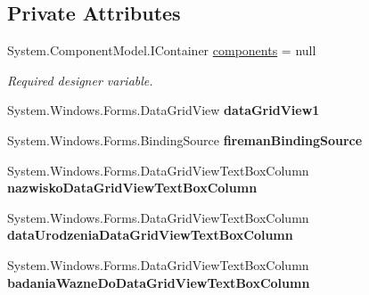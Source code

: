 \subsection*{Private Attributes}
\begin{DoxyCompactItemize}
\item 
System.\+Component\+Model.\+I\+Container \mbox{\hyperlink{class_statystyki___o_s_p_1_1_fireman_list_form_aa543afa3e418462460450e4efa38e36b}{components}} = null
\begin{DoxyCompactList}\small\item\em Required designer variable. \end{DoxyCompactList}\item 
\mbox{\label{class_statystyki___o_s_p_1_1_fireman_list_form_a4cbd98d75b5ea7ee9e566c17a7966263}} 
System.\+Windows.\+Forms.\+Data\+Grid\+View {\bfseries data\+Grid\+View1}
\item 
\mbox{\label{class_statystyki___o_s_p_1_1_fireman_list_form_a0b006fb124993936b90db630acc646e5}} 
System.\+Windows.\+Forms.\+Binding\+Source {\bfseries fireman\+Binding\+Source}
\item 
\mbox{\label{class_statystyki___o_s_p_1_1_fireman_list_form_a0364d362d59d57fcc4186bc61b7800b2}} 
System.\+Windows.\+Forms.\+Data\+Grid\+View\+Text\+Box\+Column {\bfseries nazwisko\+Data\+Grid\+View\+Text\+Box\+Column}
\item 
\mbox{\label{class_statystyki___o_s_p_1_1_fireman_list_form_a6dbfb2368f6fb24b4ca98623faa0e5b6}} 
System.\+Windows.\+Forms.\+Data\+Grid\+View\+Text\+Box\+Column {\bfseries data\+Urodzenia\+Data\+Grid\+View\+Text\+Box\+Column}
\item 
\mbox{\label{class_statystyki___o_s_p_1_1_fireman_list_form_a306205a8e85a42aada670fdfdfca2682}} 
System.\+Windows.\+Forms.\+Data\+Grid\+View\+Text\+Box\+Column {\bfseries badania\+Wazne\+Do\+Data\+Grid\+View\+Text\+Box\+Column}
\item 
\mbox{\label{class_statystyki___o_s_p_1_1_fireman_list_form_aa4910f056582877faee359d97ed607d3}} 

\end{DoxyCompactItemize}
